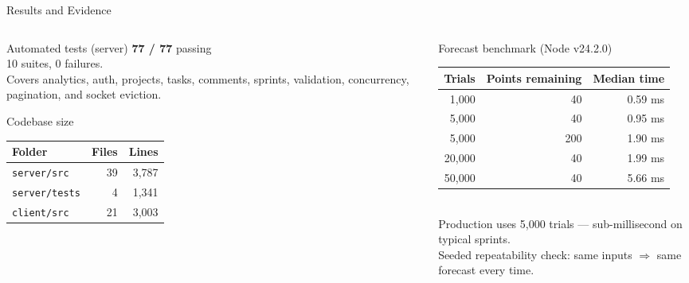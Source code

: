 \documentclass[11pt,aspectratio=169]{beamer}
\begin{document}
\begin{frame}{Results and Evidence}
  \begin{columns}[T]
    \begin{column}{0.46\textwidth}
      \begin{block}{Automated tests (server)}
        \Large\centering\textbf{77 / 77} \normalsize passing\\[2pt]
        \footnotesize 10 suites, 0 failures.\\Covers analytics, auth, projects, tasks, comments, sprints, validation, concurrency, pagination, and socket eviction.
      \end{block}
      \begin{block}{Codebase size}
        \footnotesize
        \begin{tabular}{@{}lrr@{}}
          Folder & Files & Lines \\ \midrule
          \texttt{server/src}   & 39 & 3,787 \\
          \texttt{server/tests} &  4 & 1,341 \\
          \texttt{client/src}   & 21 & 3,003 \\
        \end{tabular}
      \end{block}
    \end{column}
    \begin{column}{0.50\textwidth}
      \begin{block}{Forecast benchmark (Node v24.2.0)}
        \footnotesize
        \begin{tabular}{@{}rrr@{}}
          \toprule
          Trials & Points remaining & Median time \\ \midrule
          1,000  & 40  & 0.59 ms \\
          5,000  & 40  & 0.95 ms \\
          5,000  & 200 & 1.90 ms \\
          20,000 & 40  & 1.99 ms \\
          50,000 & 40  & 5.66 ms \\
          \bottomrule
        \end{tabular}\\[4pt]
        \scriptsize Production uses 5,000 trials --- sub-millisecond on typical sprints.\\
        Seeded repeatability check: same inputs $\Rightarrow$ same forecast every time.
      \end{block}
    \end{column}
  \end{columns}
\end{frame}
\end{document}

